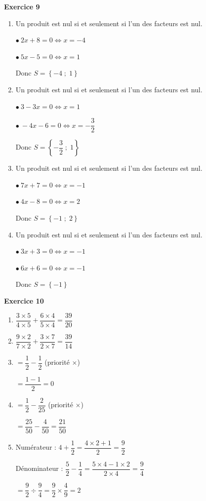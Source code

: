 \documentclass[12pt,a4paper,french]{article}
\begin{document}
\noindent\textbf{Exercice 9}\par
\smallskip
\begin{enumerate}
\item Un produit est nul si et seulement si l'un des facteurs est nul.

$\bullet\ 2x + 8 = 0 \Leftrightarrow x = -4$

$\bullet\ 5x - 5 = 0 \Leftrightarrow x = 1$

Donc $S = \left\{-4 \; ; \; 1\right\}$

\item Un produit est nul si et seulement si l'un des facteurs est nul.

$\bullet\ 3 - 3x = 0 \Leftrightarrow x = 1$

$\bullet\ -4x - 6 = 0 \Leftrightarrow x = - \dfrac{3}{2}$

Donc $S = \left\{- \dfrac{3}{2} \; ; \; 1\right\}$

\item Un produit est nul si et seulement si l'un des facteurs est nul.

$\bullet\ 7x + 7 = 0 \Leftrightarrow x = -1$

$\bullet\ 4x - 8 = 0 \Leftrightarrow x = 2$

Donc $S = \left\{-1 \; ; \; 2\right\}$

\item Un produit est nul si et seulement si l'un des facteurs est nul.

$\bullet\ 3x + 3 = 0 \Leftrightarrow x = -1$

$\bullet\ 6x + 6 = 0 \Leftrightarrow x = -1$

Donc $S = \left\{-1\right\}$

\end{enumerate}
\medskip

\noindent\textbf{Exercice 10}\par
\smallskip
\begin{enumerate}
\item $\dfrac{3 \times 5}{4 \times 5} + \dfrac{6 \times 4}{5 \times 4} = \dfrac{39}{20}$
\item $\dfrac{9 \times 2}{7 \times 2} + \dfrac{3 \times 7}{2 \times 7} = \dfrac{39}{14}$
\item $= \dfrac{1}{2} - \dfrac{1}{2}$ (priorité $\times$)

$= \dfrac{1 - 1}{2} = 0$
\item $= \dfrac{1}{2} - \dfrac{2}{25}$ (priorité $\times$)

$= \dfrac{25}{50} - \dfrac{4}{50} = \dfrac{21}{50}$
\item Numérateur : $4 + \dfrac{1}{2} = \dfrac{4 \times 2 + 1}{2} = \dfrac{9}{2}$

Dénominateur : $\dfrac{5}{2} - \dfrac{1}{4} = \dfrac{5 \times 4 - 1 \times 2}{2 \times 4} = \dfrac{9}{4}$

$= \dfrac{9}{2} \div \dfrac{9}{4} = \dfrac{9}{2} \times \dfrac{4}{9} = 2$
\end{enumerate}
\medskip
\end{document}
